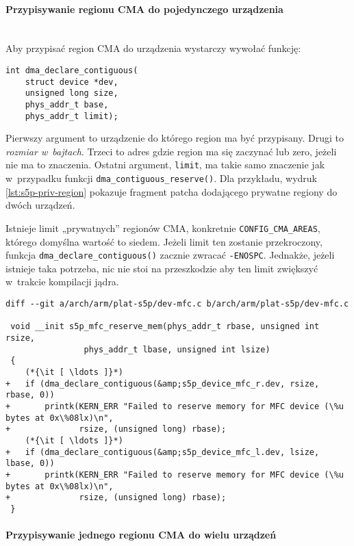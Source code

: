 \paragraph{Przypisywanie regionu CMA do pojedynczego urządzenia} \hspace{0pt} \\

Aby przypisać region CMA do urządzenia wystarczy wywołać funkcję:

\begin{lstlisting}
int dma_declare_contiguous(
	struct device *dev,
	unsigned long size,
	phys_addr_t base,
	phys_addr_t limit);
\end{lstlisting}

Pierwszy argument to urządzenie do którego region ma być przypisany.
Drugi to \emph{rozmiar w~bajtach}.  Trzeci to adres gdzie region ma
się zaczynać lub zero, jeżeli nie ma to znaczenia.  Ostatni argument,
\lstinline|limit|, ma takie samo znaczenie jak w~przypadku funkcji
\lstinline|dma_contiguous_reserve()|.  Dla przykładu, wydruk
\ref{lst:s5p-priv-region} pokazuje fragment patcha dodającego prywatne
regiony do dwóch urządzeń.

Istnieje limit „prywatnych” regionów CMA, konkretnie
\lstinline|CONFIG_CMA_AREAS|, którego domyślna wartość to siedem.
Jeżeli limit ten zostanie przekroczony, funkcja
\lstinline|dma_declare_contiguous()| zacznie zwracać
\lstinline|-ENOSPC|.  Jednakże, jeżeli istnieje taka potrzeba, nic nie
stoi na przeszkodzie aby ten limit zwiększyć w~trakcie kompilacji
jądra.

\begin{lstlisting}[float=tbhp,caption={Przypisanie prywatnych regionów
      CMA do dwóch urządzeń.},label=lst:s5p-priv-region]
diff --git a/arch/arm/plat-s5p/dev-mfc.c b/arch/arm/plat-s5p/dev-mfc.c

 void __init s5p_mfc_reserve_mem(phys_addr_t rbase, unsigned int rsize,
 				phys_addr_t lbase, unsigned int lsize)
 {
	(*{\it [ \ldots ]}*)
+	if (dma_declare_contiguous(&amp;s5p_device_mfc_r.dev, rsize, rbase, 0))
+		printk(KERN_ERR "Failed to reserve memory for MFC device (\%u bytes at 0x\%08lx)\n",
+		       rsize, (unsigned long) rbase);
	(*{\it [ \ldots ]}*)
+	if (dma_declare_contiguous(&amp;s5p_device_mfc_l.dev, lsize, lbase, 0))
+		printk(KERN_ERR "Failed to reserve memory for MFC device (\%u bytes at 0x\%08lx)\n",
+		       rsize, (unsigned long) rbase);
 }
\end{lstlisting}

\paragraph{Przypisywanie jednego regionu CMA do wielu urządzeń} \hspace{0pt} \\

